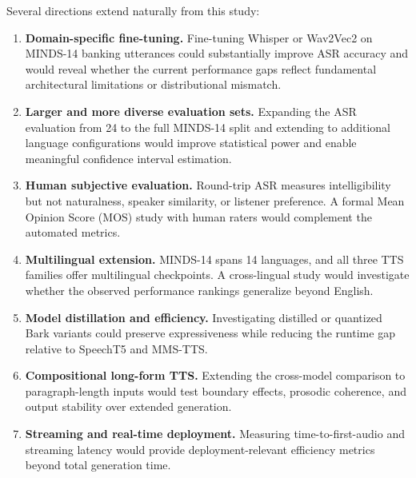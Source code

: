 \documentclass[conference]{IEEEtran}
\begin{document}
Several directions extend naturally from this study:

\begin{enumerate}
    \item \textbf{Domain-specific fine-tuning.} Fine-tuning Whisper or Wav2Vec2 on MINDS-14 banking utterances could substantially improve ASR accuracy and would reveal whether the current performance gaps reflect fundamental architectural limitations or distributional mismatch.
    \item \textbf{Larger and more diverse evaluation sets.} Expanding the ASR evaluation from 24 to the full MINDS-14 split and extending to additional language configurations would improve statistical power and enable meaningful confidence interval estimation.
    \item \textbf{Human subjective evaluation.} Round-trip ASR measures intelligibility but not naturalness, speaker similarity, or listener preference. A formal Mean Opinion Score (MOS) study with human raters would complement the automated metrics.
    \item \textbf{Multilingual extension.} MINDS-14 spans 14 languages, and all three TTS families offer multilingual checkpoints. A cross-lingual study would investigate whether the observed performance rankings generalize beyond English.
    \item \textbf{Model distillation and efficiency.} Investigating distilled or quantized Bark variants could preserve expressiveness while reducing the runtime gap relative to SpeechT5 and MMS-TTS.
    \item \textbf{Compositional long-form TTS.} Extending the cross-model comparison to paragraph-length inputs would test boundary effects, prosodic coherence, and output stability over extended generation.
    \item \textbf{Streaming and real-time deployment.} Measuring time-to-first-audio and streaming latency would provide deployment-relevant efficiency metrics beyond total generation time.
\end{enumerate}

\end{document}
